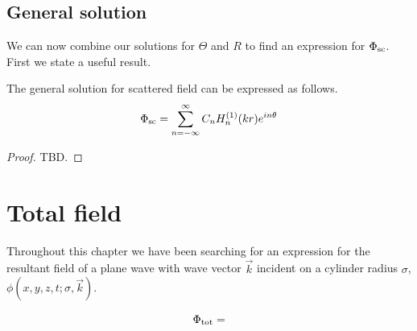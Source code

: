 \subsection{General solution}
We can now combine our solutions for $\Theta$ and $R$ to find an expression for $\Phi_{\text{sc}}$. First we state a useful result.
%
    \begin{propn} The general solution for scattered field can be expressed as follows.
        \begin{equation*}
            \Phi_{\text{sc}} = \sum^\infty_{n=-\infty} C_n H_n^{(1)}(kr)e^{in\theta}
        \end{equation*}
    \end{propn}
    \begin{proof} TBD.
    \end{proof}
\section{Total field}
Throughout this chapter we have been searching for an expression for the resultant field of a plane wave with wave vector $\vec{k}$ incident on a cylinder radius $\sigma$, $\phi(x,y,z,t;\sigma, \vec{k})$.\par 
%
    \begin{propn}
        \begin{equation*}
            \Phi_{\text{tot}} =  
        \end{equation*}
    \end{propn}







